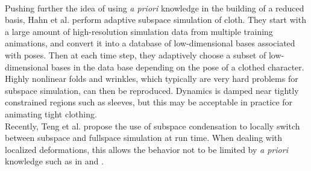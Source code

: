 \\
Pushing further the idea of using \textit{a priori} knowledge in the building of a reduced basis, Hahn et al. \cite{Hahn2014} perform adaptive subspace simulation of cloth. They start with a large amount of high-resolution simulation data from multiple training animations, and convert it into a database of low-dimensional bases associated with poses. Then at each time step, they adaptively choose a subset of low-dimensional bases in the data base depending on the pose of a clothed character.
Highly nonlinear folds and wrinkles, which typically are very hard problems for subspace simulation, can then be reproduced. Dynamics is damped near tightly constrained regions such as sleeves, but this may be acceptable in practice for animating tight clothing.
\\
Recently, Teng et al. \cite{Teng2015} propose the use of subspace condensation to locally switch between subspace and fullspace simulation at run time. When dealing with localized deformations, this allows the behavior not to be limited by \textit{a priori} knowledge such as in \cite{Harmon2013} and \cite{Hahn2014}.

